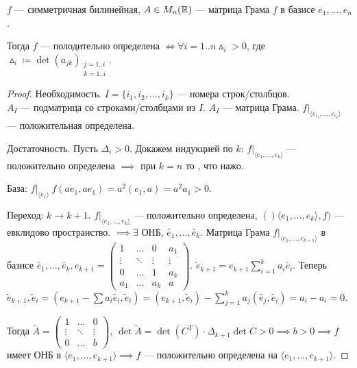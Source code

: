   \begin{theorem}
    $f$ --- симметричная билинейная,  $A \in M_n(\mathbb{R})$ --- матрица Грама  $f$  в базисе $e_1, \ldots, e_n$.

    Тогда $f$ --- полодительно определена  $\iff \forall i = 1..n \vartriangle_i > 0$, где $\vartriangle_i \coloneqq \det(a_{jk})_{\substack{j=1..i\\k=1..i}}$.
\end{theorem}
\begin{proof}
    Необходимость. $I = \{i_1, i_2, \ldots, i_k\}$ --- номера строк/столбцов.
\\
    $A_I$ --- подматрица со строками/столбцами из  $I$.  $A_I$ --- матрица Грама.  $f\Big|_{\langle e_{i_1}, \ldots, e_{i_k} \rangle}$ --- положительная определена.

    Достаточность. Пусть $\Delta_i > 0$. Докажем индукцией по $k$:  $f\Big|_{\langle e_1, \ldots, e_k\rangle}$ ---  положительно определена $\implies$ при  $k = n$ то , что нажо.

    База:  $f \Big|_{\langle e_1 \rangle}\ f(ae_1, ae_1) = a^2(e_1, a) = a^2a_1 > 0$.

    Переход: $k \to k + 1$.  $f\Big|_{\langle e_1, \ldots, e_k \rangle}$ --- положительно определена, $()\langle e_1, \ldots, e_k \rangle, f)$ --- евклидово пространство. $\implies \exists$ ОНБ, $\widetilde{e_1}, \ldots, \widetilde{e_k}$. Матрица Грама $f \Big|_{\langle e_1, \ldots, e_{k+1} \rangle}$ в базисе $\widetilde{e_1}, \ldots, \widetilde{e_k}, e_{k+1} =
    \left(\begin{array}{ccc|c}
    1 & \ldots & 0 & a_1\\
    \vdots & \ddots & \vdots & \vdots\\
    0 & \ldots & 1 & a_k\\ \hline
    a_1 & \ldots & a_k & a
\end{array}\right)$. 
$\widetilde{e}_{k+1} = e_{k+1} \sum\limits_{i=1}^k a_i\widetilde{e_i}$. Теперь $\widetilde{e}_{k+1}, \widetilde{e}_i = (e_{k+1} - \sum a_i \widetilde{e_i}, \widetilde{e}_i) = (e_{k+1}, \widetilde{e}_i) - \sum\limits_{j=1}^k a_j(\widetilde{e_j}, \widetilde{e_i}) = a_i - a_i = 0$.

Тогда $\widetilde{A} = 
\begin{pmatrix}
    1 & \ldots & 0\\
    \vdots & \ddots & \vdots\\
    0 & \ldots & b
\end{pmatrix}$, $\det \widetilde{A} = \det (C^T) \cdot \Delta_{k+1} \det C > 0 \implies b > 0 \implies f$ имеет ОНБ в $\langle e_1, \ldots, e_{k+1} \rangle \implies f$ --- положительно определена на $\langle e_1, \ldots, e_{k+1} \rangle$.
\end{proof}

